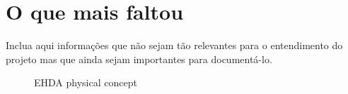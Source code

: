 \chapter{O que mais faltou}

Inclua aqui informações que não sejam tão relevantes para o entendimento do projeto mas que ainda sejam importantes para documentá-lo. 

\begin{figure}[H]
    \centering
    \caption{EHDA physical concept }
\end{figure}